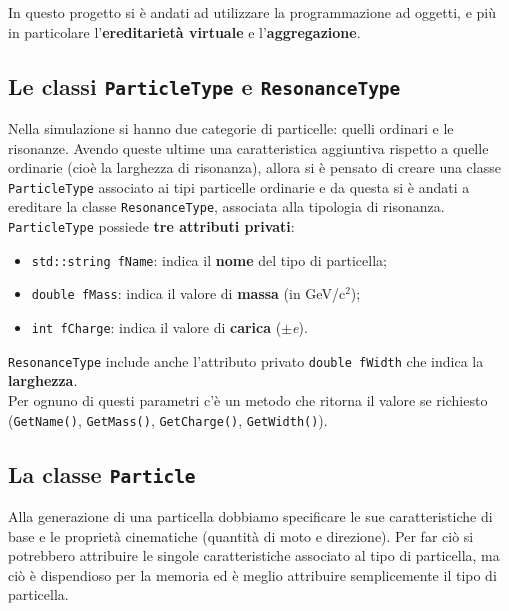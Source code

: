 In questo progetto si è andati ad utilizzare la programmazione ad oggetti, e più in particolare l'\textbf{ereditarietà virtuale} e l'\textbf{aggregazione}.

\subsection*{Le classi \texttt{ParticleType} e \texttt{ResonanceType}}
Nella simulazione si hanno due categorie di particelle: quelli ordinari e le risonanze. Avendo queste ultime una caratteristica aggiuntiva rispetto a quelle ordinarie (cioè la larghezza di risonanza), allora si è pensato di creare una classe \verb|ParticleType| associato ai tipi particelle ordinarie e da questa si è andati a ereditare la classe \verb|ResonanceType|, associata alla tipologia di risonanza. \verb|ParticleType| possiede \textbf{tre attributi privati}:
\begin{itemize}
    \item \verb|std::string fName|: indica il \textbf{nome} del tipo di particella;
    \item \verb|double fMass|: indica il valore di \textbf{massa} (in GeV/c$^2$);
    \item \verb|int fCharge|: indica il valore di \textbf{carica} ($\pm$\textit{e}).
\end{itemize}
\verb|ResonanceType| include anche l'attributo privato \verb|double fWidth| che indica la \textbf{larghezza}.\\
Per ognuno di questi parametri c'è un metodo che ritorna il valore se richiesto (\verb|GetName()|, \verb|GetMass()|, \verb|GetCharge()|, \verb|GetWidth()|).

\subsection*{La classe \texttt{Particle}}

Alla generazione di una particella dobbiamo specificare le sue caratteristiche di base e le proprietà cinematiche (quantità di moto e direzione). Per far ciò si potrebbero attribuire le singole caratteristiche associato al tipo di particella, ma ciò è dispendioso per la memoria ed è meglio attribuire semplicemente il tipo di particella.\\

